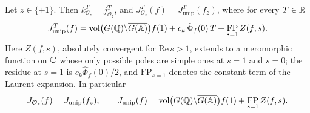 \begin{proposition}\label{prop:central}
Let $z\in\{\pm1\}$. Then $k^T_{\mathcal O_z}=j^T_{\mathcal O_z}$, and
$J^T_{\mathcal O_z}(f)=J^T_{\mathrm{unip}}(f_z)$, where for every $T\in\mathbb{R}$
\begin{equation}\label{eq:Junip}
J^T_{\mathrm{unip}}(f)=\operatorname{vol}\bigl(G(\mathbb{Q})\backslash\overline{G(\mathbb{A})}\bigr)f(1)
+c_k\,\hat\Phi_f(0)\,T+\mathop{\mathrm{FP}}_{s=1}Z(f,s).
\end{equation}
Here $Z(f,s)$, absolutely convergent for $\mathrm{Re}\,s>1$, extends to a
meromorphic function on $\mathbb{C}$ whose only possible poles are simple ones at
$s=1$ and $s=0$; the residue at $s=1$ is $c_k\hat\Phi_f(0)/2$, and
$\mathrm{FP}_{s=1}$ denotes the constant term of the Laurent expansion.
In particular
\[
J_{\mathcal O_z}(f)=J_{\mathrm{unip}}(f_z),\qquad
J_{\mathrm{unip}}(f)=\operatorname{vol}\bigl(G(\mathbb{Q})\backslash\overline{G(\mathbb{A})}\bigr)f(1)
+\mathop{\mathrm{FP}}_{s=1}Z(f,s).
\]
\end{proposition}

